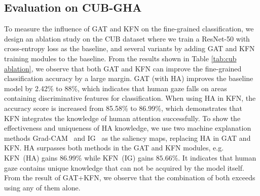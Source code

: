 \documentclass{bmvc2k}
\begin{document}
\subsection{Evaluation on CUB-GHA}
 To measure the influence of GAT and KFN on the fine-grained classification, we design an ablation study on the CUB dataset where we train a ResNet-50 with cross-entropy loss as the baseline, and several variants by adding GAT and KFN training modules to the baseline. 
From the results shown in Table \ref{tab:cub ablation}, we observe that both GAT and KFN can improve the fine-grained classification accuracy by a large margin. GAT (with HA) improves the baseline model by 2.42\% to 88\%, which indicates that human gaze falls on areas containing discriminative features for classification. When using HA in KFN, the accuracy score is increased from 85.58\% to 86.99\%, which demonstrates that KFN integrates the knowledge of human attention successfully. To show the effectiveness and uniqueness of HA knowledge, we use two machine explanation methods Grad-CAM~\cite{20_grad_cam} and IG~\cite{IG} 
as the saliency maps, replacing HA in GAT and KFN. HA surpasses both methods in the GAT and KFN modules, e.g. KFN~(HA) gains $86.99\%$ while KFN~(IG) gains $85.66\%$. It indicates that human gaze contains unique knowledge that can not be acquired by the model itself. From the result of GAT+KFN, we observe that the combination of both exceeds using any of them alone. 
\end{document}
